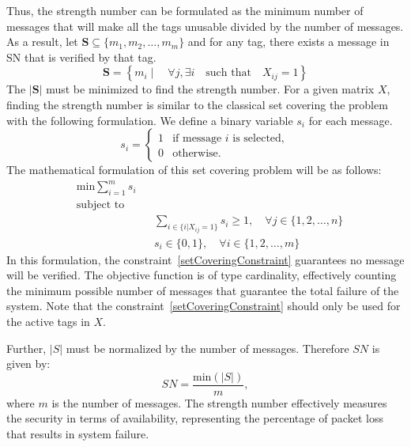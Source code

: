 Thus, the strength number can be formulated as the minimum number of messages that will make all the tags unusable divided by the number of messages. As a result, let \( \textbf{S} \subseteq \{m_1, m_2, \ldots, m_m\} \) and for any tag, there exists a message in SN that is verified by that tag. 
\begin{equation}
  \textbf{S} = \left\{m_i \mid \quad \forall j, \exists i \quad \text{such that} \quad X_{ij}=1 \right\} 
\end{equation}
The $|\textbf{S}|$ must be minimized to find the strength number. 
For a given matrix $X$, finding the strength number is similar to the classical set covering the problem with the following formulation. We define a binary variable \( s_i \) for each message.
\begin{equation}
s_i =
\begin{cases} 
1 & \text{if message $i$ is selected} , \\
0 & \text{otherwise}.
\end{cases}
\end{equation}
The mathematical formulation of this set covering problem will be as follows:
\begin{align}
& \text{min} \sum_{i=1}^{m} s_i  &&  \\
& \text{subject to}&& \nonumber\\
& && \sum_{i \in \{i| X_{ij}=1\}} s_i \geq 1, \quad \forall j \in \{1, 2, \ldots, n\} \label{setCoveringConstraint} \\
& && s_i \in \{0, 1\}, \quad \forall i \in \{1, 2, \ldots, m\}
\end{align}
In this formulation, the constraint~\eqref{setCoveringConstraint} guarantees no message will be verified. The objective function is of type cardinality, effectively counting the minimum possible number of messages that guarantee the total failure of the system. Note that the constraint~\eqref{setCoveringConstraint} should only be used for the active tags in $X$. 

Further, $|S|$ must be normalized by the number of messages. Therefore $SN$ is given by:
\begin{equation}
    SN = \dfrac{\text{min}(|S|)}{m},
\end{equation}
where $m$ is the number of messages. The strength number effectively measures the security in terms of availability, representing the percentage of packet loss that results in system failure.

